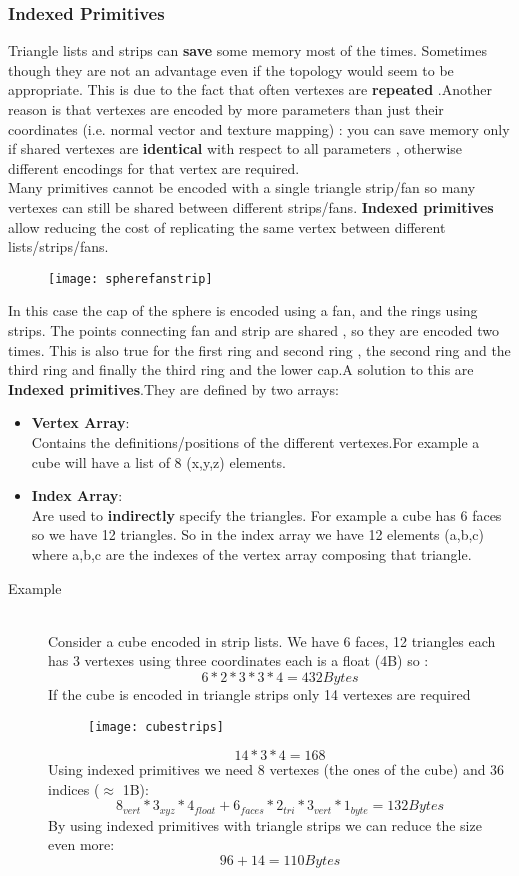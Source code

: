 \subsubsection{Indexed Primitives}

Triangle lists and strips can \textbf{save} some memory most of the times. Sometimes though they are not an advantage even if the topology would seem to be appropriate. This is due to the fact that often vertexes are \textbf{repeated} .Another reason is that vertexes are encoded by more parameters than just their coordinates (i.e. normal vector and texture mapping) : you can save memory only if shared vertexes are \textbf{identical} with respect to all parameters , otherwise different encodings for that vertex are required.\\
Many primitives cannot be encoded with a single triangle strip/fan so many vertexes can still be shared between different strips/fans. \textbf{Indexed primitives} allow reducing the cost of replicating the same vertex between different lists/strips/fans. 
\begin{figure}[H]
  \centering
  \texttt{[image: spherefanstrip]}
\end{figure}
In this case the cap of the sphere is encoded using a fan, and the rings using strips. The points connecting fan and strip are shared , so they are encoded two times. This is also true for the first ring and second ring , the second ring and the third ring and finally the third ring and the lower cap.A solution to this are \textbf{Indexed primitives}.They are defined by two arrays:
\begin{itemize}
\item \textbf{Vertex Array}:\\
Contains the definitions/positions of the different vertexes.For example a cube will have a list of 8 (x,y,z) elements.
\item \textbf{Index Array}:\\
Are used to \textbf{indirectly} specify the triangles. For example a cube has 6 faces so we have 12 triangles. So in the index array we have 12 elements (a,b,c) where a,b,c are the indexes of the vertex array composing that triangle. 
\end{itemize}

\begin{description}
\item[Example]\hfill\\
Consider a cube encoded in strip lists. We have 6 faces, 12 triangles each has 3 vertexes using three coordinates each is a float (4B) so :
$$ 6*2*3*3*4 = 432 Bytes$$
If the cube is encoded in triangle strips only 14 vertexes are required
\begin{figure}[H]
  \centering
  \texttt{[image: cubestrips]}
\end{figure}
$$ 14*3*4=168$$
Using indexed primitives we need 8 vertexes (the ones of the cube) and 36 indices ($\approx$ 1B):
$$ 8_{vert}*3_{xyz}*4_{float} + 6_{faces}*2_{tri}*3_{vert}*1_{byte}= 132 Bytes$$
By using indexed primitives with triangle strips we can reduce the size even more:
$$ 96+14=110 Bytes$$
\end{description}

